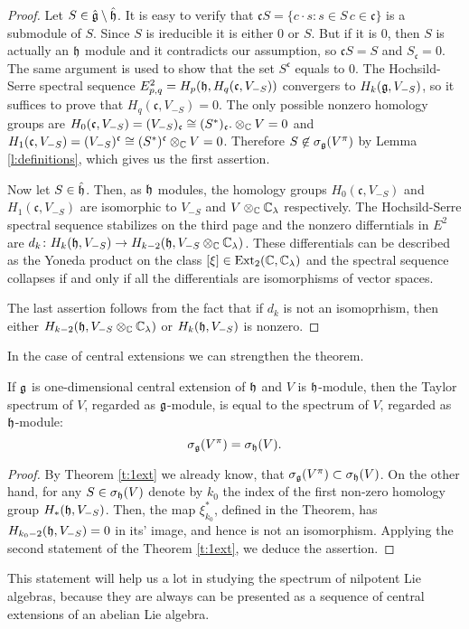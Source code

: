 \begin{proof}
    Let $S \in \hat{\mathfrak{g}} \setminus \hat{\mathfrak{h}}$. It is easy to verify that $\mathfrak{c}S=\{c\cdot s
    \colon s \in S\, c \in \mathfrak{c}\}$ is a submodule of $S$. Since $S$ is ireducible it is
    either $0$ or $S$. But if it is $0$, then $S$ is actually an $\mathfrak{h}$ module and it contradicts
    our assumption, so $\mathfrak{c}S = S$ and $S_\mathfrak{c} = 0$. The same argument is used
    to show that the set $S^\mathfrak{c}$ equals to $0$. The Hochsild-Serre spectral sequence
    $E^2_{p, q} = H_p(\mathfrak{h}, H_q(\mathfrak{c}, V_{-S}))$ convergers to $H_k(\mathfrak{g}, V_{-S})$, so it
    suffices to prove that $H_q(\mathfrak{c}, V_{- S})= 0$. The only possible nonzero homology
    groups are $H_0(\mathfrak{c}, V_{-S}) = (V_{-S})_\mathfrak{c} \cong (S^*)_\mathfrak{c}.
    \otimes_{\mathbb{C}} V = 0$ and $H_1(\mathfrak{c}, V_{-S}) = (V_{-S})^\mathfrak{c} \cong
    (S^*)^\mathfrak{c} \otimes_{\mathbb{C}} V = 0$. Therefore $S \not\in \sigma_{\mathfrak{g}}(V^\pi)$ by Lemma
    \ref{l:definitions}, which gives us the first assertion.

    Now let $S \in \hat{\mathfrak{h}}$. Then, as $\mathfrak{h}$ modules, the homology groups $H_0(\mathfrak{c},
    V_{-S})$ and $H_1(\mathfrak{c}, V_{-S})$ are isomorphic to $V_{-S}$ and $V\otimes_{\mathbb{C}}
    \mathbb{C}_\lambda$ respectively. The Hochsild-Serre spectral sequence stabilizes on the third page
    and the nonzero differntials in $E^2$ are $d_k\colon H_k(\mathfrak{h}, V_{-S}) \to H_{k - 2}(\mathfrak{h},
    V_{-S}\otimes_{\mathbb{C}} \mathbb{C}_\lambda)$. These differentials can be described as the Yoneda product on
    the class $[\xi] \in \operatorname{Ext}_2(\mathbb{C}, \mathbb{C}_\lambda)$ and the spectral sequence collapses if and only
    if all the differentials are isomorphisms of vector spaces.

    The last assertion follows from the fact that if $d_k$ is not an isomoprhism, then either
    $H_{k - 2}(\mathfrak{h},  V_{-S}\otimes_{\mathbb{C}} \mathbb{C}_\lambda)$ or $H_k(\mathfrak{h}, V_{-S})$ is nonzero.
\end{proof}
In the case of central extensions we can strengthen the theorem.
\begin{corollary}
    If $\mathfrak{g}$ is one-dimensional central extension of $\mathfrak{h}$ and $V$ is $\mathfrak{h}$-module, then
    the Taylor spectrum of $V$, regarded as $\mathfrak{g}$-module, is equal to the spectrum of $V$,
    regarded as $\mathfrak{h}$-module:
    \[
        \sigma_{\mathfrak{g}}(V^\pi) = \sigma_{\mathfrak{h}}(V).
    \]

\end{corollary}
\begin{proof}
    By Theorem \ref{t:1ext} we already know, that $\sigma_{\mathfrak{g}}(V^\pi) \subset \sigma_{\mathfrak{h}}(V)$. On
    the other hand, for any $S\in \sigma_{\mathfrak{h}}(V)$ denote by $k_0$ the index of the first non-zero
    homology group $H_*(\mathfrak{h}, V_{-S})$. Then, the map $\xi^*_{k_0}$, defined in the Theorem, has
    $H_{k_0 - 2}(\mathfrak{h}, V_{-S}) = 0$ in its' image, and hence is not an isomorphism. Applying the
    second statement of the Theorem \ref{t:1ext}, we deduce the assertion.
\end{proof}
This statement will help us a lot in studying the spectrum of nilpotent Lie algebras, because they are
always can be presented as a sequence of central extensions of an abelian Lie algebra.
